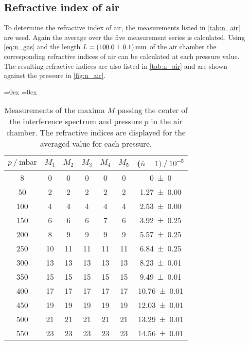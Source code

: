 \subsection{Refractive index of air}
To determine the refractive index of air, the measurements listed in \autoref{tab:n_air} are used.
Again the average over the five measurement series is calculated. Using \autoref{eq:n_gas} and the length $L = \qty{100 +- 0.1}{\milli\metre}$ of the air chamber 
the corresponding refractive indices of air can be calculated at each 
pressure value. The resulting refractive indices are also listed in \autoref{tab:n_air} and are shown against the pressure in \autoref{fig:n_air}.
\begin{table}
  \centering
  \aboverulesep=0ex %
  \belowrulesep=0ex %
  \caption{Measurements of the maxima $M$ passing the center of the interference spectrum and pressure $p$ in the air chamber. 
  The refractive indices are displayed for the averaged value for each pressure.}
  \label{tab:n_air}
  \begin{tabular}{c | c c c c c | c}
    \toprule
    {$p \mathbin{/} \unit{\milli\bar}$} & {$M_1$} & {$M_2$} & {$M_3$} & {$M_4$} & {$M_5$} & {($\overline{n} -1) \mathbin{/} 10^{-5}$}\\
    \midrule
    \rule{0pt}{1.1EM}
    {  8} & { 0} & { 0} & { 0} & { 0} & { 0} & \num{0 +-0}\\
    { 50} & { 2} & { 2} & { 2} & { 2} & { 2} & \num{1.27+-0.00}\\
    {100} & { 4} & { 4} & { 4} & { 4} & { 4} & \num{2.53+-0.00}\\
    {150} & { 6} & { 6} & { 6} & { 7} & { 6} & \num{3.92+-0.25}\\
    {200} & { 8} & { 9} & { 9} & { 9} & { 9} & \num{5.57+-0.25}\\
    {250} & {10} & {11} & {11} & {11} & {11} & \num{6.84+-0.25}\\
    {300} & {13} & {13} & {13} & {13} & {13} & \num{8.23+-0.01}\\
    {350} & {15} & {15} & {15} & {15} & {15} & \num{9.49+-0.01}\\
    {400} & {17} & {17} & {17} & {17} & {17} & \num{10.76+-0.01}\\
    {450} & {19} & {19} & {19} & {19} & {19} & \num{12.03+-0.01}\\
    {500} & {21} & {21} & {21} & {21} & {21} & \num{13.29+-0.01}\\
    {550} & {23} & {23} & {23} & {23} & {23} & \num{14.56+-0.01}\\

\end{tabular}
\end{table}
